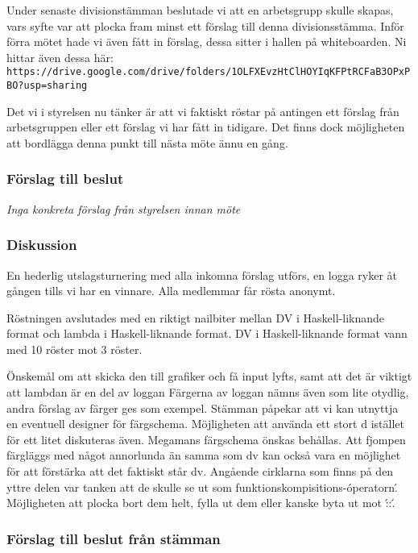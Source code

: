 \documentclass[protokoll]{dvd}
\begin{document}
Under senaste divisionstämman beslutade vi att en arbetsgrupp skulle skapas, vars syfte var att plocka fram minst ett förslag till denna divisionsstämma.
Inför förra mötet hade vi även fått in förslag, dessa sitter i hallen på whiteboarden. 
Ni hittar även dessa här: \verb|https://drive.google.com/drive/folders/1OLFXEvzHtClHOYIqKFPtRCFaB3OPxPBO?usp=sharing|

Det vi i styrelsen nu tänker är att vi faktiskt röstar på antingen ett förslag från arbetsgruppen eller ett förslag vi har fått in tidigare.
Det finns dock möjligheten att bordlägga denna punkt till nästa möte ännu en gång.

\subsubsection*{Förslag till beslut}

\emph{Inga konkreta förslag från styrelsen innan möte}

\subsubsection*{Diskussion}

En hederlig utslagsturnering med alla inkomna förslag utförs, en logga ryker åt gången tills vi har en vinnare. 
Alla medlemmar får rösta anonymt.

Röstningen avslutades med en riktigt nailbiter mellan DV i Haskell-liknande format och lambda i Haskell-liknande format.
DV i Haskell-liknande format vann med 10 röster mot 3 röster.

Önskemål om att skicka den till grafiker och få input lyfts, samt att det är viktigt att lambdan är en del av loggan
Färgerna av loggan nämns även som lite otydlig, andra förslag av färger ges som exempel. Stämman påpekar att vi kan utnyttja en eventuell designer för färgschema.
Möjligheten att använda ett stort d istället för ett litet diskuteras även. Megamans färgschema önskas behållas.
Att fjompen färgläggs med något annorlunda än samma som dv kan också vara en möjlighet för att förstärka att det faktiskt står dv.
Angående cirklarna som finns på den yttre delen var tanken att de skulle se ut som funktionskompisitions-\'operatorn\'.
Möjligheten att plocka bort dem helt, fylla ut dem eller kanske byta ut mot \'::\'.

\subsubsection*{Förslag till beslut från stämman}
\end{document}
